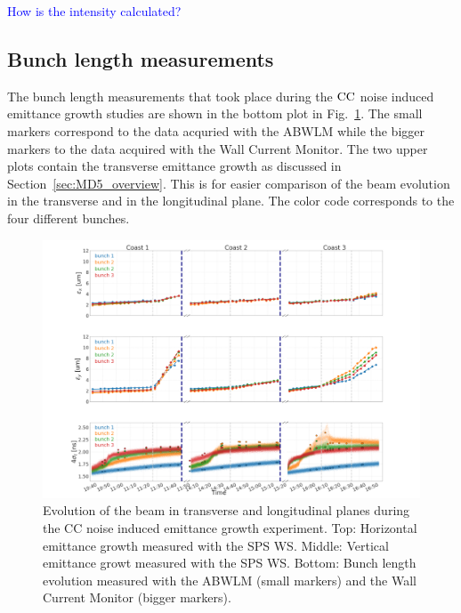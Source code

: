 \textcolor{blue}{How is the intensity calculated?}

\subsection{Bunch length measurements}\label{subsec:bunch_length_meas_2018}
The bunch length measurements that took place during the ${\mathrm{CC}}$ noise induced emittance growth studies are shown in the bottom plot in Fig.~\ref{fig:MD5_overview_x_y_sigma_t}. The small markers correspond to the data acquried with the ABWLM while the bigger markers to the data acquired with the Wall Current Monitor. The two upper plots contain the transverse emittance growth as discussed in Section~\ref{sec:MD5_overview}. This is for easier comparison of the beam evolution in the transverse and in the longitudinal plane. The color code corresponds to the four different bunches.

\begin{figure}
   \centering
   \includegraphics[width=1.0\textwidth]{images/Ch5/MD5_overview_x_no_legendMD5_overview_y_no_legendMD5_overview_4sigma_t_no_title_with_wall_current_monitor.png}
   \caption{Evolution of the beam in transverse and longitudinal planes during the CC noise induced emittance growth experiment. Top: Horizontal emittance growth measured with the SPS WS. Middle: Vertical emittance growt measured with the SPS WS. Bottom: Bunch length evolution measured with the ABWLM (small markers) and the Wall Current Monitor (bigger markers).}
   \label{fig:MD5_overview_x_y_sigma_t}
\end{figure}

